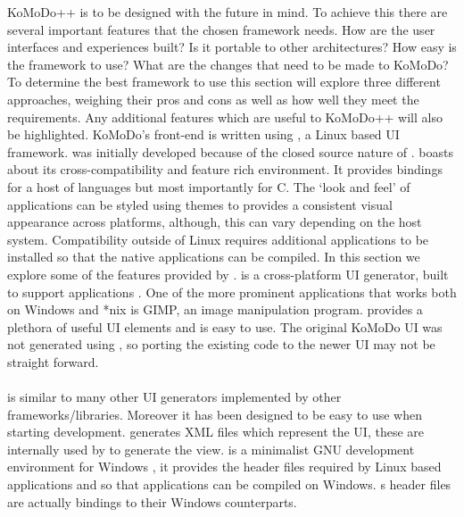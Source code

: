 \graphicspath{ {images/research/} }
%
KoMoDo++ is to be designed with the future in mind. To achieve this there are several important features that the chosen framework needs. How are the user interfaces and experiences built? Is it portable to other architectures? How easy is the framework to use? What are the changes that need to be made to KoMoDo? To determine the best framework to use this section will explore three different approaches, weighing their pros and cons as well as how well they meet the requirements. Any additional features which are useful to KoMoDo++ will also be highlighted.
%
KoMoDo's front-end is written using , a Linux based UI framework.  was initially developed because of the closed source nature of .  boasts about its cross-compatibility and feature rich environment\cite{gtk}. It provides bindings for a host of languages but most importantly for C. The  `look and feel' of  applications can be styled using themes to provides a consistent visual appearance across platforms, although, this can vary depending on the host system. Compatibility outside of Linux requires additional applications to be installed so that the native  applications can be compiled. In this section we explore some of the features provided by .
   is a cross-platform UI generator, built to support  applications \cite{glade}. One of the more prominent applications that works both on Windows and *nix is GIMP, an image manipulation program.  provides a plethora of useful UI elements and is easy to use. The original KoMoDo UI was not generated using , so porting the existing code to the newer UI may not be straight forward.\\\\
   is similar to many other UI generators implemented by other frameworks/libraries. Moreover it has been designed to be easy to use when starting development.  generates XML files which represent the UI, these are internally used by  to generate the view.
   is a minimalist GNU development environment for Windows \cite{mingw}, it provides the header files required by Linux based applications and  so that applications can be compiled on Windows. s header files are actually bindings to their Windows counterparts.\\\\
